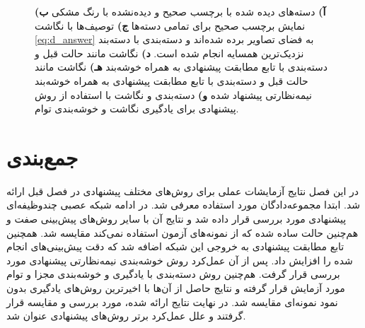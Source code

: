 \begin{figure}[t]
{  \textbf{آ)}
   دسته‌های دیده شده با برچسب صحیح و دیده‌نشده با رنگ مشکی
\textbf{ب)}
 نمایش برچسب صحیح برای تمامی دسته‌ها
  \textbf{ج)} توصیف‌ها با نگاشت \eqref{eq:d_answer}
  به فضای تصاویر برده شده‌اند و دسته‌بندی با دسته‌بند نزدیک‌ترین همسایه انجام شده است.
  \textbf{د)}
   نگاشت مانند حالت قبل و دسته‌بندی با تابع مطابقت پیشنهادی به همراه خوشه‌بند 
  \textbf{هـ)}
   نگاشت مانند حالت قبل و دسته‌بندی با تابع مطابقت پیشنهادی به همراه خوشه‌بند نیمه‌نظارتی پیشنهاد شده
  \textbf{و)}
  دسته‌بندی و نگاشت با استفاده از روش پیشنهادی برای یادگیری نگاشت و خوشه‌بندی توام.
  }
\label{fig:discussion}
\end{figure}

\section{جمع‌بندی}\label{exp:conclusion}
در این فصل نتایج آزمایشات عملی برای روش‌های مختلف پیشنهادی در فصل قبل ارائه شد. ابتدا  مجموعه‌دادگان مورد استفاده معرفی شد. در ادامه
شبکه عصبی چندوظیفه‌ای پیشنهادی مورد بررسی قرار داده شد و نتایج آن با سایر روش‌های پیش‌بینی صفت و هم‌چنین حالت ساده شده که از نمونه‌های آزمون استفاده نمی‌کند مقایسه شد. همچنین تابع مطابقت پیشنهادی به خروجی این شبکه اضافه شد که دقت پیش‌بینی‌های انجام شده را افزایش داد. پس از آن  عمل‌کرد روش خوشه‌بندی نیمه‌نظارتی پیشنهادی مورد بررسی قرار گرفت. هم‌چنین  روش دسته‌بندی  با یادگیری و خوشه‌بندی مجزا و توام مورد آزمایش قرار گرفته و نتایج حاصل از آن‌ها با اخیرترین روش‌های یادگیری بدون نمود نمونه‌ای مقایسه شد. در نهایت  نتایج ارائه شده، مورد بررسی و مقایسه قرار گرفتند و علل عمل‌کرد برتر روش‌های پیشنهادی عنوان شد.
